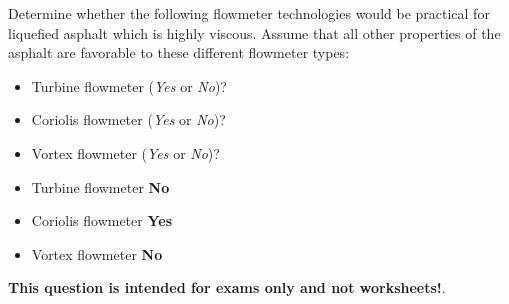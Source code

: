

Determine whether the following flowmeter technologies would be practical for liquefied asphalt which is highly viscous.  Assume that all other properties of the asphalt are favorable to these different flowmeter types:

\begin{itemize}
\item{} Turbine flowmeter ({\it Yes} or {\it No})?
\vskip 10pt
\item{} Coriolis flowmeter ({\it Yes} or {\it No})?
\vskip 10pt
\item{} Vortex flowmeter ({\it Yes} or {\it No})?
\end{itemize}







\begin{itemize}
\item{} Turbine flowmeter {\bf No}
\item{} Coriolis flowmeter {\bf Yes}
\item{} Vortex flowmeter {\bf No}
\end{itemize}







{\bf This question is intended for exams only and not worksheets!}.



